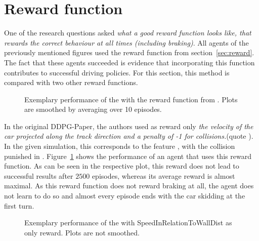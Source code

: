 \section{Reward function}

One of the research questions asked \textit{what a good reward function looks like, that rewards the \textit{correct} behaviour at all times (including braking)}. All agents of the previously mentioned figures used the reward function from section~\ref{sec:reward}. The fact that these agents succeeded is evidence that incorporating this function contributes to successful driving policies. For this section, this method is compared with two other reward functions. 

\begin{figure}[h]
	{%
		\setlength{\fboxsep}{0pt}%
		\setlength{\fboxrule}{1pt}%
	}%
	\centering
	\caption[Exemplary performance of the  with the reward function from \cite{lillicrap_continuous_2015}]{Exemplary performance of the  with the reward function from \cite{lillicrap_continuous_2015}. Plots are smoothed by averaging over 10 episodes.}
	\label{fig:dqnrewardspeedstuff}
\end{figure}

In the original DDPG-Paper, the authors used as reward only \textit{the velocity of the car projected along the track direction and a penalty of -1 for collisions.}(quote \cite{lillicrap_continuous_2015}). In the given simulation, this corresponds to the feature , with the collision punished in . Figure~\ref{fig:dqnrewardspeedstuff} shows the performance of an agent that uses this reward function. 
As can be seen in the respective plot, this reward does not lead to successful results after $2500$ episodes, whereas its average reward is almost maximal. As this reward function does not reward braking at all, the agent does not learn to do so and almost every episode ends with the car skidding at the first turn.

\begin{figure}[h]
	{%
		\setlength{\fboxsep}{0pt}%
		\setlength{\fboxrule}{1pt}%
	}%
	\centering
	\caption[Exemplary performance of the  with SpeedInRelationToWallDist as only reward.]{Exemplary performance of the  with SpeedInRelationToWallDist as only reward. Plots are not smoothed.}
	\label{fig:dqnrewardinrelationtowall}
\end{figure}

